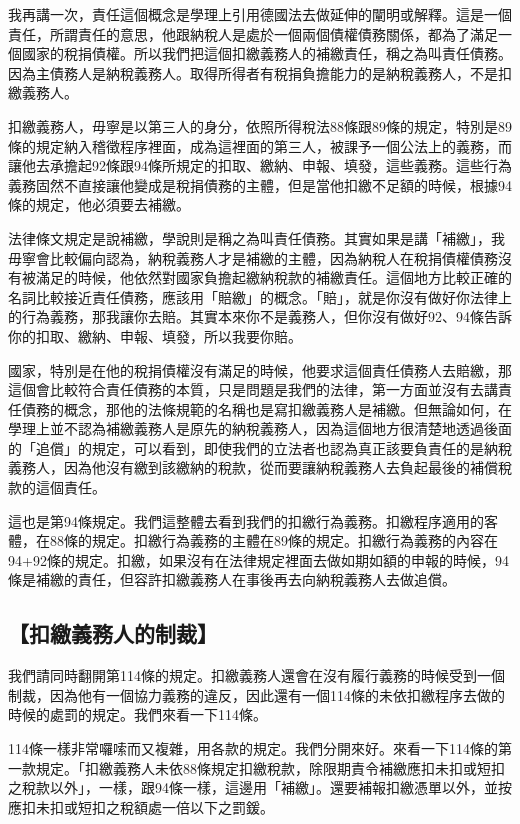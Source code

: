 \documentclass[oneside,sub3section]{ctexbook}
\begin{document}
我再講一次，責任這個概念是學理上引用德國法去做延伸的闡明或解釋。這是一個責任，所謂責任的意思，他跟納稅人是處於一個兩個債權債務關係，都為了滿足一個國家的稅捐債權。所以我們把這個扣繳義務人的補繳責任，稱之為叫責任債務。因為主債務人是納稅義務人。取得所得者有稅捐負擔能力的是納稅義務人，不是扣繳義務人。

扣繳義務人，毋寧是以第三人的身分，依照所得稅法88條跟89條的規定，特別是89條的規定納入稽徵程序裡面，成為這裡面的第三人，被課予一個公法上的義務，而讓他去承擔起92條跟94條所規定的扣取、繳納、申報、填發，這些義務。這些行為義務固然不直接讓他變成是稅捐債務的主體，但是當他扣繳不足額的時候，根據94條的規定，他必須要去補繳。

法律條文規定是說補繳，學說則是稱之為叫責任債務。其實如果是講「補繳」，我毋寧會比較偏向認為，納稅義務人才是補繳的主體，因為納稅人在稅捐債權債務沒有被滿足的時候，他依然對國家負擔起繳納稅款的補繳責任。這個地方比較正確的名詞比較接近責任債務，應該用「賠繳」的概念。「賠」，就是你沒有做好你法律上的行為義務，那我讓你去賠。其實本來你不是義務人，但你沒有做好92、94條告訴你的扣取、繳納、申報、填發，所以我要你賠。

國家，特別是在他的稅捐債權沒有滿足的時候，他要求這個責任債務人去賠繳，那這個會比較符合責任債務的本質，只是問題是我們的法律，第一方面並沒有去講責任債務的概念，那他的法條規範的名稱也是寫扣繳義務人是補繳。但無論如何，在學理上並不認為補繳義務人是原先的納稅義務人，因為這個地方很清楚地透過後面的「追償」的規定，可以看到，即使我們的立法者也認為真正該要負責任的是納稅義務人，因為他沒有繳到該繳納的稅款，從而要讓納稅義務人去負起最後的補償稅款的這個責任。

這也是第94條規定。我們這整體去看到我們的扣繳行為義務。扣繳程序適用的客體，在88條的規定。扣繳行為義務的主體在89條的規定。扣繳行為義務的內容在94+92條的規定。扣繳，如果沒有在法律規定裡面去做如期如額的申報的時候，94條是補繳的責任，但容許扣繳義務人在事後再去向納稅義務人去做追償。

\hypertarget{ux6263ux7e73ux7fa9ux52d9ux4ebaux7684ux5236ux88c1}{%
\subsection{【扣繳義務人的制裁】}\label{ux6263ux7e73ux7fa9ux52d9ux4ebaux7684ux5236ux88c1}}

我們請同時翻開第114條的規定。扣繳義務人還會在沒有履行義務的時候受到一個制裁，因為他有一個協力義務的違反，因此還有一個114條的未依扣繳程序去做的時候的處罰的規定。我們來看一下114條。

114條一樣非常囉嗦而又複雜，用各款的規定。我們分開來好。來看一下114條的第一款規定。「扣繳義務人未依88條規定扣繳稅款，除限期責令補繳應扣未扣或短扣之稅款以外」，一樣，跟94條一樣，這邊用「補繳」。還要補報扣繳憑單以外，並按應扣未扣或短扣之稅額處一倍以下之罰鍰。
\end{document}
